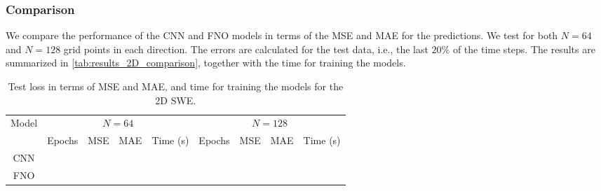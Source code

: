 \subsubsection*{Comparison}
We compare the performance of the CNN and FNO models in terms of the MSE and MAE for the predictions.
We test for both $N = 64$ and $N = 128$ grid points in each direction.
The errors are calculated for the test data, i.e., the last $20\%$ of the time steps.
The results are summarized in \autoref{tab:results_2D_comparison}, together with the time for training the models.
\begin{table}[H]
    \centering
    \small %
    \begin{tabular}{c|cccc|cccc}
        Model & \multicolumn{4}{c|}{$N = 64$} & \multicolumn{4}{c}{$N = 128$} \\
        \cline{2-9}
        & Epochs & MSE & MAE & Time (s) & Epochs & MSE & MAE & Time (s) \\
        \hline
        CNN  &
         &
         & 
         &
         &
         &
         &
         &
         
        \\
        \hline
        FNO  &
         &
         &
         &
         &
         &
         &
         &
        
        \\
        \hline
    \end{tabular}
    \caption{Test loss in terms of MSE and MAE, and time for training the models for the 2D SWE.}\label{tab:results_2D_comparison}
\end{table}
